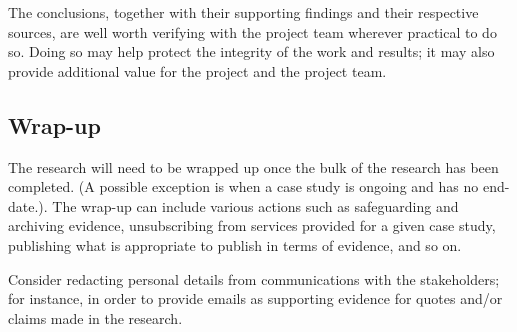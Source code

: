 The conclusions, together with their supporting findings and their respective sources, are well worth verifying with the project team wherever practical to do so. Doing so may help protect the integrity of the work and results; it may also provide additional value for the project and the project team. 

\subsection{Wrap-up}
The research will need to be wrapped up once the bulk of the research has been completed. (A possible exception is when a case study is ongoing and has no end-date.). The wrap-up can include various actions such as safeguarding and archiving evidence, unsubscribing from services provided for a given case study, publishing what is appropriate to publish in terms of evidence, and so on.

Consider redacting personal details from communications with the stakeholders; for instance, in order to provide emails as supporting evidence for quotes and/or claims made in the research. 

